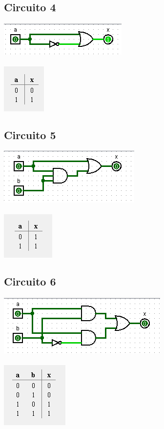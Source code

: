 \documentclass[12pt]{article}
\begin{document}
\subsection{Circuito 4}
    \includegraphics{./images/circuito04.png}\\
    \\\includegraphics{./images/circuito03_table.png}
\subsection{Circuito 5}
    \includegraphics{./images/circuito05.png}\\
    \\\includegraphics{./images/circuito04_table.png}
\subsection{Circuito 6}
    \includegraphics{./images/circuito06.png}\\
    \\\includegraphics{./images/circuito05_table.png}
\end{document}
